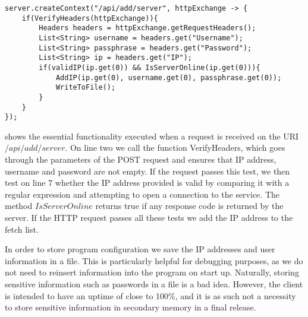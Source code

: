 \begin{lstlisting}[caption={Adding a server to the fetch list},label={lst:add_server},language=inc_Java, mathescape]
server.createContext("/api/add/server", httpExchange -> {
    if(VerifyHeaders(httpExchange)){
        Headers headers = httpExchange.getRequestHeaders();
        List<String> username = headers.get("Username");
        List<String> passphrase = headers.get("Password");
        List<String> ip = headers.get("IP");
        if(validIP(ip.get(0)) && IsServerOnline(ip.get(0))){
            AddIP(ip.get(0), username.get(0), passphrase.get(0));
            WriteToFile();
        }
    }
});
\end{lstlisting}
 shows the essential functionality executed when a request is received on the URI $/api/add/server$. On line two we call the function VerifyHeaders, which goes through the parameters of the POST request and ensures that IP address, username and password are not empty. If the request passes this test, we then test on line 7 whether the IP address provided is valid by comparing it with a regular expression and attempting to open a connection to the service. The method $IsServerOnline$ returns true if any response code is returned by the server. If the HTTP request passes all these tests we add the IP address to the fetch list.


In order to store program configuration we save the IP addresses and user information in a file. This is particularly helpful for debugging purposes, as we do not need to reinsert information into the program on start up. Naturally, storing sensitive information such as passwords in a file is a bad idea. However, the client is intended to have an uptime of close to 100\%, and it is as such not a necessity to store sensitive information in secondary memory in a final release. 